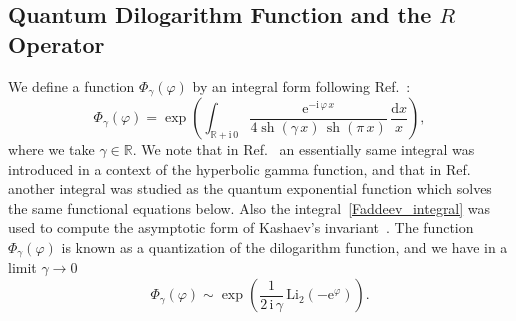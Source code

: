 \documentclass[12pt]{article}
\numberwithin{equation}{section}
\DeclareMathOperator{\sh}{sh}
\newcommand{\Li}{\mathrm{Li}_2}
\begin{document}
\subsection{Quantum Dilogarithm Function and the $R$ Operator}

We define a function  $\Phi_\gamma(\varphi)$ by an integral form
following Ref.~:
\begin{equation}
  \label{Faddeev_integral}
  \Phi_\gamma(\varphi)
  =
  \exp
  \left(
    \int_{\mathbb{R}+\mathrm{i} \, 0}
    \frac{\mathrm{e}^{- \mathrm{i} \, \varphi \, x}}
    {
      4 \sh ( \gamma \, x) \, \sh(\pi \, x)
      } \,
    \frac{\mathrm{d} x}{x}
  \right) ,
\end{equation}
where we take $\gamma \in \mathbb{R}$.
We note that in Ref.~ an essentially same integral
was introduced
in a context of the hyperbolic gamma function, and that
in Ref.~ another integral was studied  as the
quantum exponential function which solves the same functional
equations
below.
Also the integral~\eqref{Faddeev_integral} was used to compute the
asymptotic form of Kashaev's invariant~\cite{Kasha96b}.
The function $\Phi_\gamma(\varphi)$
is known as a quantization of the dilogarithm function, and
we have in a limit $\gamma \to 0$
\begin{equation}
  \label{Phi_gamma_0}
  \Phi_\gamma(\varphi)
  \sim
  \exp
  \left(
    \frac{1}{2 \,  \mathrm{i} \, \gamma} \,
    \Li(- \mathrm{e}^\varphi)
  \right) .
%
\end{equation}
\end{document}
